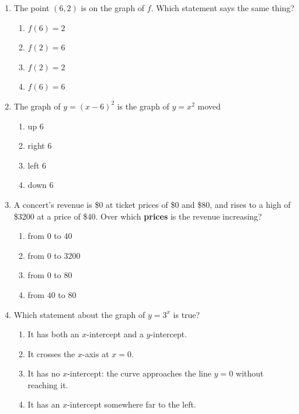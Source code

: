 \begin{enumerate}[leftmargin=1.8em, itemsep=6pt, topsep=5pt]
\small

\item The point $(6,2)$ is on the graph of $f$. Which statement says the same thing?
\begin{enumerate}[label=(\Alph*), leftmargin=2.2em, itemsep=1pt, topsep=2pt]
  \item $f(6)=2$
  \item $f(2)=6$
  \item $f(2)=2$
  \item $f(6)=6$
\end{enumerate}

\item The graph of $y=(x-6)^2$ is the graph of $y=x^2$ moved
\begin{enumerate}[label=(\Alph*), leftmargin=2.2em, itemsep=1pt, topsep=2pt]
  \item up $6$
  \item right $6$
  \item left $6$
  \item down $6$
\end{enumerate}

\item A concert's revenue is \$0 at ticket prices of \$0 and \$80, and rises to a high of \$3200 at
a price of \$40. Over which \textbf{prices} is the revenue increasing?
\begin{enumerate}[label=(\Alph*), leftmargin=2.2em, itemsep=1pt, topsep=2pt]
  \item from $0$ to $40$
  \item from $0$ to $3200$
  \item from $0$ to $80$
  \item from $40$ to $80$
\end{enumerate}

\item Which statement about the graph of $y=3^x$ is true?
\begin{enumerate}[label=(\Alph*), leftmargin=2.2em, itemsep=1pt, topsep=2pt]
  \item It has both an $x$-intercept and a $y$-intercept.
  \item It crosses the $x$-axis at $x=0$.
  \item It has no $x$-intercept: the curve approaches the line $y=0$ without reaching it.
  \item It has an $x$-intercept somewhere far to the left.
\end{enumerate}


\end{enumerate}

